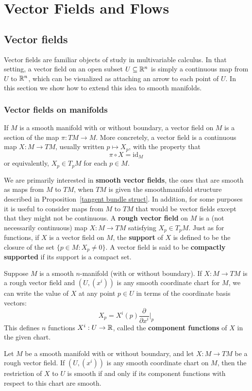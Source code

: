 \chapter{Vector Fields and Flows}
\section{Vector fields}\label{vector field section}
Vector fields are familiar objects of study in multivariable calculus. In that setting, a vector field on an open subset $U\subseteq\mathbb{R}^n$ is simply a continuous map from $U$ to $\mathbb{R}^n$, which can be visualized as attaching an arrow to each point of $U$. In this section we show how to extend this idea to smooth manifolds.
\subsection{Vector fields on manifolds}
If $M$ is a smooth manifold with or without boundary, a vector field on $M$ is a section of the map $\pi:TM\to M$. More concretely, a vector field is a continuous map $X:M\to TM$, usually written $p\mapsto X_p$, with the property that
\[\pi\circ X=\mathrm{id}_M\]
or equivalently, $X_p\in T_pM$ for each $p\in M$.\par
We are primarily interested in \textbf{smooth vector fields}, the ones that are smooth as maps from $M$ to $TM$, when $TM$ is given the smoothmanifold structure described in Proposition~\ref{tangent bundle struct}. In addition, for some purposes it is useful to consider maps from $M$ to $TM$ that would be vector fields except that they might not be continuous. A \textbf{rough vector field} on $M$ is a (not necessarily continuous) map $X:M\to TM$ satisfying $X_p\in T_pM$. Just as for functions, if $X$ is a vector field on $M$, the \textbf{support} of $X$ is defined to be the closure of the set $\{p\in M:X_p\neq 0\}$. A vector field is said to be \textbf{compactly supported} if its support is a compact set.\par
Suppose $M$ is a smooth $n$-manifold (with or without boundary). If $X:M\to TM$ is a rough vector field and $(U,(x^i))$ is any smooth coordinate chart for $M$, we can write the value of $X$ at any point $p\in U$ in terms of the coordinate basis vectors:
\[X_p=X^i(p)\frac{\partial}{\partial x^i}\Big|_p\]
This defines $n$ functions $X^i:U\to\mathbb{R}$, called the \textbf{component functions} of $X$ in the given chart.
\begin{proposition}\label{vector field smooth crit}
Let $M$ be a smooth manifold with or without boundary, and let $X:M\to TM$ be a rough vector field. If $(U,(x^i))$ is any smooth coordinate chart on $M$, then the restriction of $X$ to $U$ is smooth if and only if its component functions with respect to this chart are smooth.
\end{proposition}
